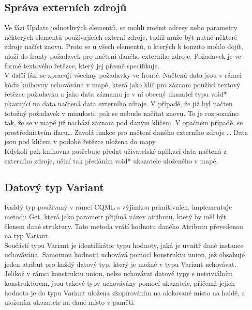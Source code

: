 \documentclass[report,11pt]{elsarticle}
\begin{document}
\subsection{Správa externích zdrojů}
Ve fázi Update jednotlivých elementů, se mohli změnit adresy nebo parametry některých elementů používajících externí zdroje, tudíž může být nutné některé zdroje načíst znovu. Proto se u všech elementů, u kterých k tomuto mohlo dojít, uloží do fronty požadavek pro načtení daného externího zdroje. Požadavek je ve formě textového řetězce, který jej přesně specifikuje.\\
V další fázi se zpracují všechny požadavky ve frontě. Načtená data jsou v rámci kódu knihovny uchovávána v mapě, která jako klíč pro záznam používá textový řetězec požadavku a jako data záznamu je v ní obecný ukazatel typu void* ukazující na data načtená data externího zdroje. V případě, že již byl načten totožný požadavek v minulosti, pak se nebude načítat znovu. To je rozpoznáno tak, že se v mapě již nachází záznam pod daným klíčem. V opačném případě, se prostřednictvím ifacu… Zavolá funkce pro načtení daného externího zdroje … Data jsou pod klíčem v podobě řetězce uložena do mapy.\\
Kdykoli pak knihovna potřebuje předat uživatelské aplikaci data načtená z externího zdroje, učiní tak předáním void* ukazatele uloženého v mapě.\\

\subsection{Datový typ Variant}
Každý typ používaný v rámci CQML s výjimkou primitivních, implementuje metodu Get, která jako parametr přijímá název atributu, který by měl být členem dané struktury. Tato metoda vrátí hodnotu daného Atributu převedenou na typ Variant.\\
Součástí typu Variant je identifikátor typu hodnoty, jaká je uvnitř dané instance uchovávána. Samotnou hodnotu uchovává pomocí konstruktu union, jež obsahuje jeden atribut pro každý datový typ, který je možné v typu Variant uchovávat. Jelikož v rámci konstruktu union, nelze uchovávat datové typy s netriviálním konstruktorem, jsou takové typy uchovávány pomocí ukazatele, přičemž jejich hodnota je do typu Variant uložena zkopírováním na alokované místo na haldě, a uložením ukazatele na dané místo v paměti.\\
\end{document}
